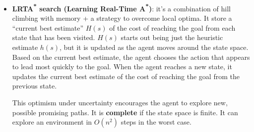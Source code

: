 \documentclass[12pt]{article}
\begin{document}
\begin{enumerate}[label=\textbf{OS.\arabic*}]
\begin{itemize}
        \item \textbf{LRTA\textsuperscript{*} search (Learning Real-Time A\textsuperscript{*})}: 
        it's a combination of hill climbing with memory + a strategy to overcome local optima.
        It store a ``current best estimate'' $H(s)$ of the cost of reaching the goal from each state that has been visited.
        $H(s)$ starts out being just the heuristic estimate $h(s)$, but it is updated as the agent moves around the state space.
        Based on the current best estimate, the agent chooses the action that appears to lead most quickly to the goal.
        When the agent reaches a new state, it updates the current best estimate of the cost of reaching the goal from 
        the previous state.

        This optimism under uncertainty encourages the agent to explore new, possible promising paths.
        It is \textbf{complete} if the state space is finite.
        It can explore an environment in $O(n^2)$ steps in the worst case.

    \end{itemize}

\end{enumerate}
\end{document}
